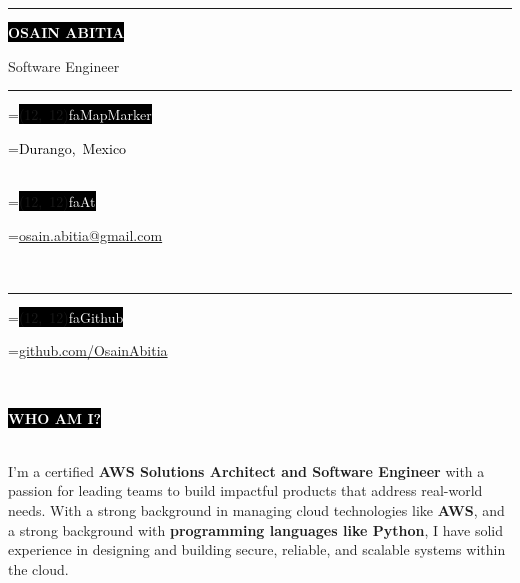 \documentclass[10pt,A4]{article}
\newcommand*{\vcenteredhbox}[1]{\begingroup
	\setbox0=\hbox{#1}\parbox{\wd0}{\box0}\endgroup}
\newcommand{\icon}[2]{\colorbox{black}{\makebox(#2, #2){\textcolor{white}{\large\csname fa#1\endcsname}}}}	%
\newcommand{\icontext}[3]{ 						%
	\vcenteredhbox{\icon{#1}{#2}}\hspace{0.2cm}\vcenteredhbox{\textcolor{black}{#3}}
}
\newcounter{a}
\newcounter{b}
\newcounter{c}
\newcommand{\cvsection}[1] {
	\textcolor{white}{\MakeUppercase{\textbf{#1}}}
}
\newcommand{\cvsect}[1]{
	\colorbox{black}{{\cvsection{#1}}}\\\\%
}
\begin{document}
	
	\begin{minipage}[t]{0.45\textwidth}\hrule height 0pt width 0pt%
		\colorbox{black}{{\HUGE\textcolor{white}{\textbf{\MakeUppercase{Osain Abitia}}}}}%
		
		\vspace{1mm}\LARGE{Software Engineer}
	\end{minipage}%
	\begin{minipage}[t]{0.3\textwidth}\hrule height 0pt width 0pt%
		\small%
		\icontext{MapMarker}{12}{Durango, Mexico}\\
		\icontext{At}{12}{\href{mailto:osain.abitia@gmail.com}{osain.abitia@gmail.com}}\\	
	\end{minipage}%
	\begin{minipage}[t]{0.3\textwidth}\hrule height 0pt width 0pt%
		\small%
		\icontext{Github}{12}{\href{https://github.com/OsainAbitia}{github.com/OsainAbitia}}\\
	\end{minipage}%
	
	\small%
	\vspace{1cm}
	
	
	\cvsect{Who Am I?}%
	\begin{minipage}[t]{1\textwidth}%
		I'm a certified \textbf{AWS Solutions Architect and Software Engineer} with a passion for 
		leading teams to build impactful products that address real-world needs. With a
		strong background in managing cloud technologies like \textbf{AWS}, and a strong background
		with \textbf{programming languages like Python}, I have solid experience in designing and building secure,
		reliable, and scalable systems within the cloud.
	\end{minipage}%
	\hfill
	\vspace{0.5cm}
	
	
\end{document}
